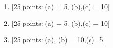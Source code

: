 \documentclass[11pt]{article}
\begin{document}
\newpage
\setcounter{page}{1}
\begin{enumerate}

\item {[25 points: (a) = 5, (b),(c) = 10]}
\vspace*{.5em}


\newpage
\item {[25 points: (a) = 5, (b),(c) = 10]}
\vspace*{.5em}


\newpage
\item {[25 points: (a), (b) = 10,(c)=5]}
\vspace*{.5em}


%

%
%

%
%


%

\end{enumerate}
\end{document}
